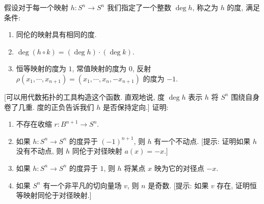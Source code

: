 \begin{exercise}
假设对于每一个映射 $h\colon S^{n}\to S^{n}$ 我们指定了一个整数 $\deg h$, 称之为 $h$ 的度, 满足条件:
\begin{enumerate}
\item 同伦的映射具有相同的度.
\item $\deg(h\circ k)=(\deg h)\cdot(\deg k)$.
\item 恒等映射的度为 $1$, 常值映射的度为 $0$, 反射 $\rho(x_1,\cdots,x_{n+1})=(x_1,\cdots,x_n,-x_{n+1})$ 的度为 $-1$.
\end{enumerate}
[可以用代数拓扑的工具构造这个函数. 直观地说, 度 $\deg h$ 表示 $h$ 将 $S^{n}$ 围绕自身卷了几重. 度的正负告诉我们 $h$ 是否保持定向.] 证明:
\begin{enumerate}
\item 不存在收缩 $r\colon B^{n+1}\to S^{n}$.
\item 如果 $h\colon S^{n}\to S^{n}$ 的度异于 $(-1)^{n+1}$, 则 $h$ 有一个不动点. [提示: 证明如果 $h$ 没有不动点, 则 $h$ 同伦于对径映射 $a(x)=-x$.]
\item 如果 $h\colon S^{n}\to S^{n}$ 的度异于 $1$, 则 $h$ 将某点 $x$ 映为它的对径点 $-x$.
\item 如果 $S^{n}$ 有一个非平凡的切向量场 $v$, 则 $n$ 是奇数. [提示: 如果 $v$ 存在, 证明恒等映射同伦于对径映射.]
\end{enumerate}
\end{exercise}